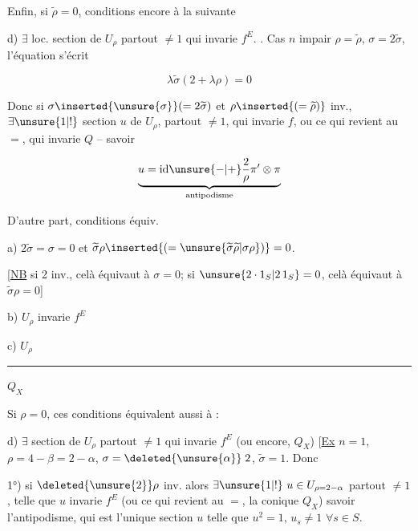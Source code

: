 Enfin, si $\widetilde\rho=0$,  conditions  encore à la suivante


d) $\exists$ loc. section  de $U_\rho$ partout $\ne1$ qui invarie $f^E$. .
 Cas $n$ impair $\rho=\widetilde\rho$, $\sigma=2\widetilde\sigma$, l'équation s'écrit

\[
\lambda\widetilde\sigma(2+\lambda\rho)=0
\]

Donc si $\sigma\inserted{\unsure{\sigma}}(=2\widetilde\sigma)$ et $\rho\inserted{(=\widetilde\rho)}$ inv.,  $\exists\unsure{1|!}$ section $u$ de $U_\rho$, partout $\ne1$,  qui invarie $f$, ou ce qui revient au $=$, qui invarie $Q$ -- savoir

\[
\underbrace{u=\mathrm{id}\unsure{-|+}\frac{2}{\rho}\pi'\otimes\pi}_{\text{antipodisme}}
\]

D'autre part, conditions équiv.

 a) $2\widetilde\sigma=\sigma=0$ et $\widetilde\sigma\rho\inserted{(=\unsure{\widetilde\sigma\widetilde\rho|\sigma\rho})}=0$.

[\uline{NB} si 2 inv., celà équivaut à $\sigma=0$; si $\unsure{2\cdot1_S|2\,1_S}=0$, celà équivaut à $\widetilde\sigma\rho=0$]

b) $U_\rho$ invarie $f^E$

c) $U_\rho$ \rule{1.6cm}{0.35pt} $Q_X$

Si  $\rho=0$, ces conditions équivalent aussi à :

d) $\exists$  section de $U_\rho$ partout $\ne1$ qui invarie $f^E$ (ou encore, $Q_X$)
[\uline{Ex} $n=1$, $\rho=4-\beta=2-\alpha$, $\sigma=\deleted{\unsure{\alpha}}\;2$, $\widetilde\sigma=1$. Donc

 1°) si $\deleted{\unsure{2}}\rho$ inv.  alors $\exists\unsure{1|!}\ u\in U_{\rho=2-\alpha}$ partout $\ne1$, telle que $u$ invarie $f^E$ (ou ce qui revient au $=$,  la conique $Q_X$) savoir l'antipodisme, qui est l'unique section $u$ telle que $u^2=1$, $u_s\ne1$ $\forall s\in S$.

